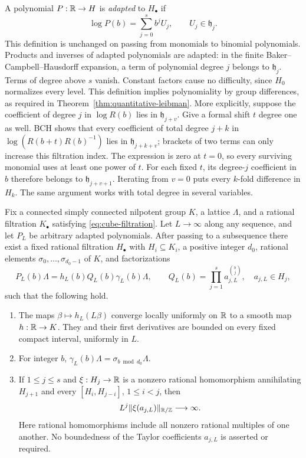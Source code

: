 A polynomial $P:\mathbb R\to H$ is \emph{adapted} to $H_\bullet$ if
\[
 \log P(b)=\sum_{j=0}^s b^j U_j,\qquad U_j\in\mathfrak h_j.
\]
This definition is unchanged on passing from monomials to binomial
polynomials.  Products and inverses of adapted polynomials are adapted:
in the finite Baker--Campbell--Hausdorff expansion, a term of polynomial
degree $j$ belongs to $\mathfrak h_j$.  Terms of degree above $s$ vanish.
Constant factors cause no difficulty, since $H_0$ normalizes every level.
This definition implies polynomiality by group differences, as required
in Theorem~\ref{thm:quantitative-leibman}.  More explicitly, suppose the
coefficient of degree $j$ in $\log R(b)$ lies in
$\mathfrak h_{j+v}$.  Give a formal shift $t$ degree one as well.
BCH shows that every coefficient of total degree $j+k$ in
$\log(R(b+t)R(b)^{-1})$ lies in $\mathfrak h_{j+k+v}$; brackets of
two terms can only increase this filtration index.  The expression is
zero at $t=0$, so every surviving monomial uses at least one power of
$t$.  For each fixed $t$, its degree-$j$ coefficient in $b$ therefore
belongs to $\mathfrak h_{j+v+1}$.  Iterating from $v=0$ puts every
$k$-fold difference in $H_k$.  The same argument works with total
degree in several variables.

\begin{lemma}
\label{lem:adapted-factorization}
Fix a connected simply connected nilpotent group $K$, a lattice $\Lambda$,
and a rational filtration $K_\bullet$ satisfying
\eqref{eq:cube-filtration}.  Let $L\to\infty$ along any sequence, and let
$P_L$ be arbitrary adapted polynomials.  After passing to a subsequence
there exist a fixed rational filtration $H_\bullet$ with $H_i\subseteq K_i$,
a positive integer $d_0$, rational elements $\sigma_0,\ldots,\sigma_{d_0-1}$
of $K$, and factorizations
\begin{equation}
 P_L(b)\Lambda
 =h_L(b)Q_L(b)\gamma_L(b)\Lambda,
 \qquad
 Q_L(b)=\prod_{j=1}^s a_{j,L}^{\binom bj},\quad a_{j,L}\in H_j,
 \label{eq:adapted-factorization}
\end{equation}
such that the following hold.
\begin{enumerate}
\item The maps $\beta\mapsto h_L(L\beta)$ converge locally uniformly on
$\mathbb R$ to a smooth map $h:\mathbb R\to K$.  They and their first derivatives are
bounded on every fixed compact interval, uniformly in $L$.
\item For integer $b$,
$\gamma_L(b)\Lambda=\sigma_{b\bmod d_0}\Lambda$.
\item If $1\leq j\leq s$ and $\xi:H_j\to\mathbb R$ is a nonzero rational
homomorphism annihilating $H_{j+1}$ and every $[H_i,H_{j-i}]$,
$1\leq i<j$, then
\begin{equation}
 L^j\lVert\xi(a_{j,L})\rVert_{\mathbb R/\mathbb Z}\longrightarrow\infty.
 \label{eq:level-irrationality}
\end{equation}
Here rational homomorphisms include all nonzero rational multiples of one
another.  No boundedness of the Taylor coefficients $a_{j,L}$ is asserted
or required.
\end{enumerate}
\end{lemma}

